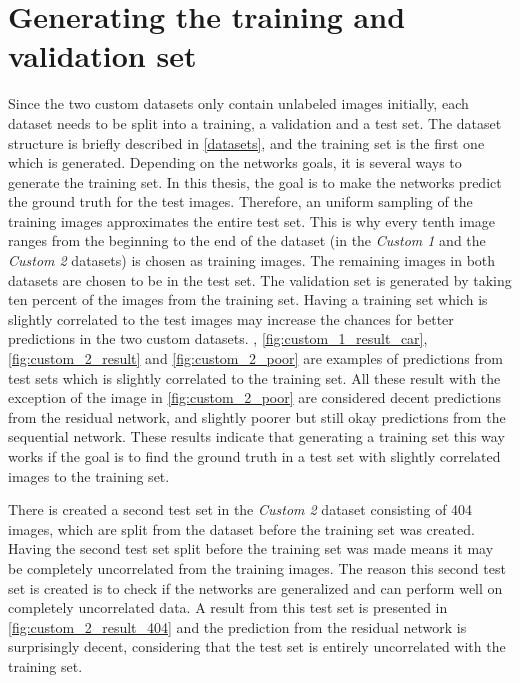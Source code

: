 \documentclass[USenglish]{ifimaster}  %
\begin{document}
\section{Generating the training and validation set}
Since the two custom datasets only contain unlabeled images initially, each dataset needs to be split into a training, a validation and a test set. The dataset structure is briefly described in \vref{datasets}, and the training set is the first one which is generated. Depending on the networks goals, it is several ways to generate the training set. In this thesis, the goal is to make the networks predict the ground truth for the test images. Therefore, an uniform sampling of the training images approximates the entire test set. This is why every tenth image ranges from the beginning to the end of the dataset (in the \textit{Custom 1} and the \textit{Custom 2} datasets) is chosen as training images. The remaining images in both datasets are chosen to be in the test set. The validation set is generated by taking ten percent of the images from the training set. Having a training set which is slightly correlated to the test images may increase the chances for better predictions in the two custom datasets. , \vref{fig:custom_1_result_car}, \vref{fig:custom_2_result} and \vref{fig:custom_2_poor} are examples of predictions from test sets which is slightly correlated to the training set. All these result with the exception of the image in \vref{fig:custom_2_poor} are considered decent predictions from the residual network, and slightly poorer but still okay predictions from the sequential network. These results indicate that generating a training set this way works if the goal is to find the ground truth in a test set with slightly correlated images to the training set. 

There is created a second test set in the \textit{Custom 2} dataset consisting of 404 images, which are split from the dataset before the training set was created. Having the second test set split before the training set was made means it may be completely uncorrelated from the training images. The reason this second test set is created is to check if the networks are generalized and can perform well on completely uncorrelated data. A result from this test set is presented in \vref{fig:custom_2_result_404} and the prediction from the residual network is surprisingly decent, considering that the test set is entirely uncorrelated with the training set.         
\end{document}
